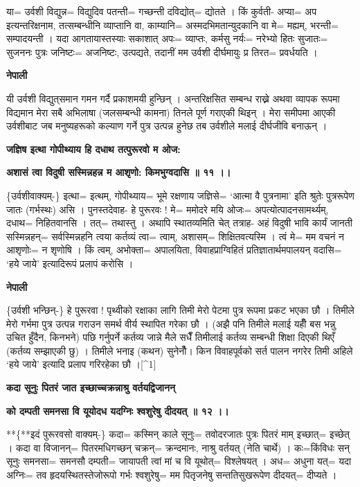 \documentclass[11pt, a5paper]{article}
\begin{document}
या= उर्वशी विद्युन्न= विद्युदिव पतन्ती= गच्छन्ती दविद्योत्= द्योतते । किं कुर्वती- अप्या= अप इत्यन्तरिक्षनाम, तत्सम्बन्धीनि व्याप्तानि वा, काम्यानि= अस्मदभिमतान्युदकानि वा मे= मह्यम्, भरन्ती= सम्पादयन्ती । यदा आगतायास्तस्याः सकाशात् अपः= व्याप्तः, कर्मसु नर्यः= नरेभ्यो हितः सुजातः= सुजननः पुत्रः जनिष्टः‍= अजनिष्टः, उत्पद्यते, तदानीं मम उर्वशी दीर्घमायुः प्र तिरत= प्रवर्धयति ।

\textbf{नेपाली}

यी उर्वशी विद्युत्‌समान गमन गर्दै प्रकाशमयी हुन्छिन् । अन्तरिक्षसित सम्बन्ध राख्ने अथवा व्यापक रूपमा विद्यमान मेरा सबै अभिलाषा (जलसम्बन्धी कामना) तिनले पूर्ण गराएकी थिइन् । मेरा समीपमा आएकी उर्वशीबाट जब मनुष्यहरूको कल्याण गर्ने पुत्र उत्पन्न हुनेछ तब उर्वशीले मलाई दीर्घजीवि बनाऊन् ।

\textbf{जज्ञिष इत्था गोपीथ्याय हि दधाथ तत्पुरूरवो म ओज:}

\textbf{अशासं त्वा विदुषी सस्मिन्नहन्न म आशृणो: किमभुग्वदासि ॥ ११ ।।}

\{उर्वशीवाक्यम्-\} इत्था= इत्थम्, गोपीथ्याय= भूमे रक्षणाय जज्ञिसे= ‘आत्मा वै पुत्रनामा’ इति श्रुतेः पुत्ररूपेण जातः (गर्भस्थः) असि । पुनस्तदेवाह- हे पुरूरवः ! मे= ममोदरे मयि ओजः= अपत्योत्पादनसामर्थ्यम्, दधाथ= निहितवानसि । तत्= तथास्तु । अथापि स्थातव्यमिति चेत् तत्राह- अहं विदुषी भावि कार्यं जानती सस्मिन्नहन्= सर्वस्मिन्नहनि त्वया कर्तव्यं त्वा= त्वाम्, अशासम्= शिक्षितवत्यस्मि । त्वं मे= मम वचनं न आशृणोः= न शृणोषि । किं त्वम्, अभोक्ता= अपालयिता, विवाहप्राग्विहितं प्रतिज्ञातार्थमपालयन् वदासि= ‘हयेे जाये’ इत्यादिरूपं प्रलापं करोसि ।

\textbf{नेपाली}

\{उर्वशी भन्छिन्-\} हे पुरूरवा ! पृथ्वीको रक्षाका लागि तिमी मेरो पेटमा पुत्र रूपमा प्रकट भएका छौ । तिमीले मेरो गर्भमा पुत्र उत्पन्न गराउन समर्थ वीर्य स्थापित गरेका छौ । (अझै पनि तिमीले मलाई यहीँ बस भन्नु उचित हुँदैन, किनभने) पछि गर्नुपर्ने कर्तव्य जान्ने मैले सधैँ तिमीलाई कर्तव्य सम्बन्धी शिक्षा दिएकी थिएँ (कर्तव्य सम्झाएकी छु) । तिमीले भनाइ (कथन) सुनेनौँ। किन विवाहपूर्वको सर्त पालन नगरेर तिमी अहिले ‘हये जाये’ इत्यादि प्रलाप गरिरहेका छौ ।[^1]

\textbf{कदा सूनुः पितरं जात इच्छाच्चक्रन्नाश्रु वर्तयद्विजानन्}

\textbf{को दम्पती समनसा वि यूयोदध यदग्निः श्वशुरेषु दीदयत् ॥ १२ ।।}

**\{**इदं पुरूरवसो वाक्यम्-\} कदा= कस्मिन् काले सूनुः= तवोदरजातः पुत्रः पितरं माम् इच्छात्= इच्छेत् । कदा वा विजानन्= पितरमधिगच्छन् चक्रन्= क्रन्दमानः, नाश्रु वर्तयत् (नेति चार्थे) । कः=किंविधः सन् सूनुः समनसा= समनसौ दम्पती= जायापती त्वां मां च वि यूथोत्= विश्लेषयत् । अध= अधुना यत्= यदा अग्निः= तव हृदयस्थितस्तेजोरूपो गर्भः श्वशुरेषु= मम पितृजनेषु सन्ततिसुखरूपेण दीदयत्= दीप्यते ।
\end{document}
